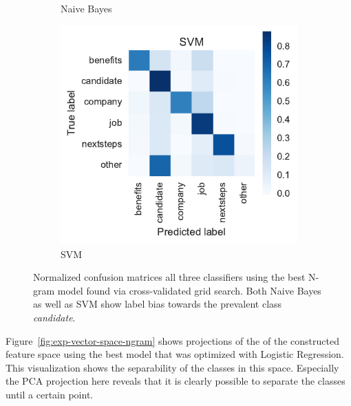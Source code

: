 \begin{figure}[h]
\begin{subfigure}[b]{0.32\textwidth}
        \caption{Naive Bayes}
        \label{fig:exp-vector-space-conf-matrix-ngram-naivebayes-normalized}
    \end{subfigure}
    \begin{subfigure}[b]{0.32\textwidth}
        \includegraphics[width=\textwidth]{img/exp-vector-space-conf-matrix-ngram-svm-normalized.pdf}
        \caption{SVM}
        \label{fig:exp-vector-space-conf-matrix-ngram-svm-normalized}
    \end{subfigure}
    \caption{Normalized confusion matrices all three classifiers using the best N-gram model found via cross-validated grid search. Both Naive Bayes as well as SVM show label bias towards the prevalent class \emph{candidate}.}
  \label{fig:exp-vector-space-conf-matrix-ngram}
\end{figure}

Figure~\ref{fig:exp-vector-space-ngram} shows projections of the of the constructed feature space using the best model that was optimized with Logistic Regression. This visualization shows the separability of the classes in this space. Especially the PCA projection here reveals that it is clearly possible to separate the classes until a certain point.

